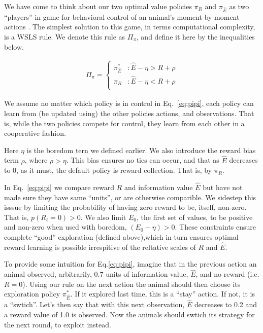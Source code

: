 We have come to think about our two optimal value policies $\pi_R$ and $\pi_{\hat E}$ as two ``players'' in game for behavioral control of an animal's moment-by-moment actions \cite{Estes1994TowardAS}. The simplest solution to this game, in terms computational complexity, is a WSLS rule. We denote this rule as $\Pi_\pi$, and define it here by the inequalities below. 

\begin{equation} 
    \label{eq:pipi}
    \begin{split}
        \Pi_{\pi} = 
        \begin{cases}
            \pi^*_{\hat{E}} & : \hat{E} - \eta > R + \rho \\
            \pi_R 	& : \hat{E} - \eta < R + \rho \\
        \end{cases}
    \end{split}
\end{equation}

We assume no matter which policy is in control in Eq.~\ref{eq:pipi}, each policy can learn from (be updated using) the other policies actions, and observations. That is, while the two policies compete for control, they learn from each other in a cooperative fashion.

Here $\eta$ is the boredom tern we defined earlier. We also introduce the reward bias term $\rho$, where $\rho > \eta$. This bias ensures no ties can occur, and that as $\hat E$ decreases to 0, as it must, the default policy is reward collection. That is, by $\pi_R$.

In Eq.~\ref{eq:pipi} we compare reward $R$ and information value $\hat E$ but have not made sure they have same ``units'', or are otherwise comparible. We sidestep this isssue by limiting the probability of having zero reward to be, itself, non-zero. That is, $p(R_t=0) > 0$. We also limit $E_0$, the first set of values, to be positive and non-zero when used with boredom, $(E_0 - \eta) > 0$. These constraints ensure complete ``good'' exploration (defined above),which in turn ensures optimal reward learning is possible irrespitive of the reltative scales of $R$ and $\hat E$.

To provide some intuition for Eq.\ref{eq:pipi}, imagine that in the previous action an animal observed, arbitrarily, 0.7 units of information value, $\hat E$, and no reward (i.e. $R = 0$). Using our rule on the next action the animal should then choose its exploration policy $\pi^*_{\hat{E}}$. If it explored last time, this is a ``stay'' action. If not, it is a ``swtich''. Let's then say that with this next observation, $\hat E$ decreases to 0.2 and a reward value of 1.0 is observed. Now the animals should swtich its strategy for the next round, to exploit instead. 

